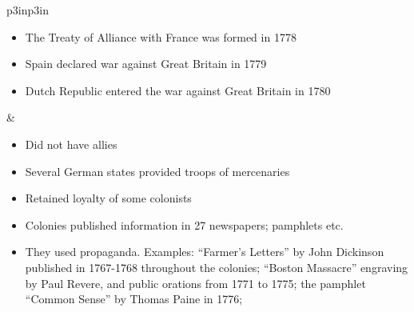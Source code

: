 
\begin{singlespace}
\footnotesize
  \tablelasttail{}
  \label{table:comparison}
\begin{mpxtabular}{p{3in}p{3in}}%
  \ML
  \begin{itemize}[nolistsep,leftmargin=*]
    \item The Treaty of Alliance with France was formed in 1778
    \item Spain declared war against Great Britain in 1779 
    \item Dutch Republic entered the war against Great Britain in 1780 \cite[85,89]{stewart_2005}
  \end{itemize}
  &
  \begin{itemize}[nolistsep,leftmargin=*]
      \item  Did not have allies
      \item  Several German states provided troops of
	mercenaries \cite[62]{stewart_2005}
      \item  Retained loyalty of some colonists
  \end{itemize}\ML
  \ML
	\begin{itemize}[nolistsep,leftmargin=*]
	    \item  Colonies published information in 27 newspapers; pamphlets
	      etc. \cite[49,199]{knollenberg_growth_2003}
	    \item  They used propaganda.  Examples: ``Farmer's Letters'' by John
	      Dickinson published in 1767-1768 throughout the colonies; “Boston
	      Massacre” engraving by Paul Revere, and public orations from 1771
	      to 1775; the pamphlet “Common Sense” by Thomas Paine in 1776;

\end{itemize}
\end{mpxtabular}
\end{singlespace}
